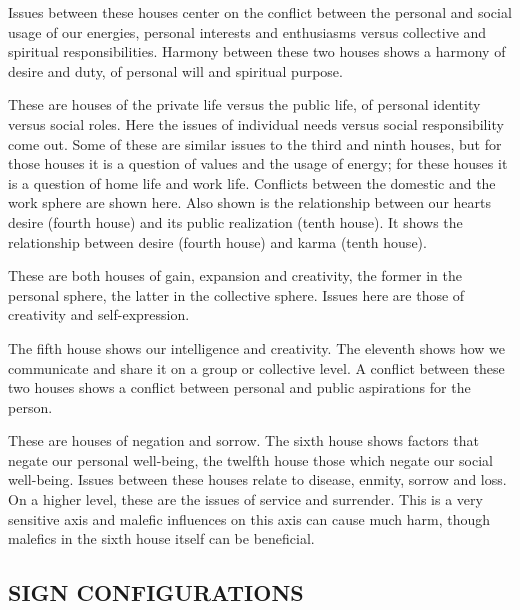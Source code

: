 Issues between these houses center on the conflict between the personal and social usage of our energies, personal interests and enthusiasms versus collective and spiritual responsibilities. Harmony between these two houses shows a harmony of desire and duty, of personal will and spiritual purpose.

 


 

These are houses of the private life versus the public life, of personal identity versus social roles. Here the issues of individual needs versus social responsibility come out. Some of these are similar issues to the third and ninth houses, but for those houses it is a question of values and the usage of energy; for these houses it is a question of home life and work life. Conflicts between the domestic and the work sphere are shown here. Also shown is the relationship between our hearts desire (fourth house) and its public realization (tenth house). It shows the relationship between desire (fourth house) and karma (tenth house).

 


 

These are both houses of gain, expansion and creativity, the former in the personal sphere, the latter in the collective sphere. Issues here are those of creativity and self-expression.

The fifth house shows our intelligence and creativity. The eleventh shows how we communicate and share it on a group or collective level. A conflict between these two houses shows a conflict between personal and public aspirations for the person.

 


 

These are houses of negation and sorrow. The sixth house shows factors that negate our personal well-being, the twelfth house those which negate our social well-being. Issues between these houses relate to disease, enmity, sorrow and loss. On a higher level, these are the issues of service and surrender. This is a very sensitive axis and malefic influences on this axis can cause much harm, though malefics in the sixth house itself can be beneficial.

 

\subsection{SIGN CONFIGURATIONS}
 

